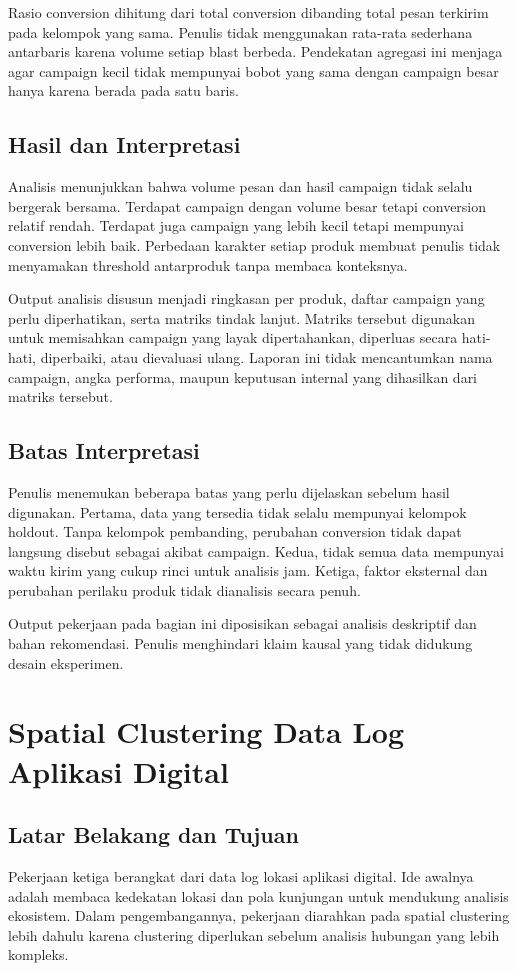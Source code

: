 Rasio conversion dihitung dari total conversion dibanding total pesan terkirim pada kelompok yang sama. Penulis tidak menggunakan rata-rata sederhana antarbaris karena volume setiap blast berbeda. Pendekatan agregasi ini menjaga agar campaign kecil tidak mempunyai bobot yang sama dengan campaign besar hanya karena berada pada satu baris.

\subsection{Hasil dan Interpretasi}
Analisis menunjukkan bahwa volume pesan dan hasil campaign tidak selalu bergerak bersama. Terdapat campaign dengan volume besar tetapi conversion relatif rendah. Terdapat juga campaign yang lebih kecil tetapi mempunyai conversion lebih baik. Perbedaan karakter setiap produk membuat penulis tidak menyamakan threshold antarproduk tanpa membaca konteksnya.

Output analisis disusun menjadi ringkasan per produk, daftar campaign yang perlu diperhatikan, serta matriks tindak lanjut. Matriks tersebut digunakan untuk memisahkan campaign yang layak dipertahankan, diperluas secara hati-hati, diperbaiki, atau dievaluasi ulang. Laporan ini tidak mencantumkan nama campaign, angka performa, maupun keputusan internal yang dihasilkan dari matriks tersebut.

\subsection{Batas Interpretasi}
Penulis menemukan beberapa batas yang perlu dijelaskan sebelum hasil digunakan. Pertama, data yang tersedia tidak selalu mempunyai kelompok holdout. Tanpa kelompok pembanding, perubahan conversion tidak dapat langsung disebut sebagai akibat campaign. Kedua, tidak semua data mempunyai waktu kirim yang cukup rinci untuk analisis jam. Ketiga, faktor eksternal dan perubahan perilaku produk tidak dianalisis secara penuh.

Output pekerjaan pada bagian ini diposisikan sebagai analisis deskriptif dan bahan rekomendasi. Penulis menghindari klaim kausal yang tidak didukung desain eksperimen.

\section{Spatial Clustering Data Log Aplikasi Digital}

\subsection{Latar Belakang dan Tujuan}
Pekerjaan ketiga berangkat dari data log lokasi aplikasi digital. Ide awalnya adalah membaca kedekatan lokasi dan pola kunjungan untuk mendukung analisis ekosistem. Dalam pengembangannya, pekerjaan diarahkan pada spatial clustering lebih dahulu karena clustering diperlukan sebelum analisis hubungan yang lebih kompleks.

